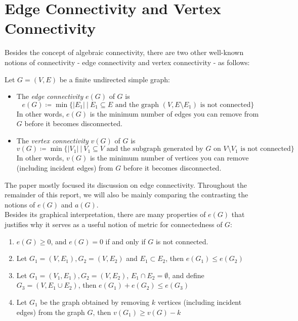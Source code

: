 \documentclass{article}
\begin{document}
\section{Edge Connectivity and Vertex Connectivity}

Besides the concept of algebraic connectivity, there are two other well-known notions of connectivity - edge connectivity and vertex connectivity - as follows:

\begin{definition}
    Let $G = (V, E)$ be a finite undirected simple graph:
    \begin{itemize}
        \item The \textit{edge connectivity} $e(G)$ of $G$ is
    \[e(G) \coloneqq \min \{|E_1|\ |\ E_1 \subseteq E \text{ and the graph $(V, E \setminus E_1)$ is not connected}\}\]
    In other words, $e(G)$ is the minimum number of edges you can remove from $G$ before it becomes disconnected.
    \item The \textit{vertex connectivity} $v(G)$ of $G$ is
    \[v(G) \coloneqq \min \{|V_1|\ |\ V_1 \subseteq V \text{ and the subgraph generated by $G$ on $V\setminus V_1$ is not connected}\}\]
    In other words, $v(G)$ is the minimum number of vertices you can remove (including incident edges) from $G$ before it becomes disconnected.
    \end{itemize}
\end{definition}

The paper mostly focused its discussion on edge connectivity. Throughout the remainder of this report, we will also be mainly comparing the contrasting the notions of $e(G)$ and $a(G)$.\\

Besides its graphical interpretation, there are many properties of $e(G)$ that justifies why it serves as a useful notion of metric for connectedness of $G$:

\begin{theorem}\label{thm::e_facts}
        \begin{enumerate}
        \item $e(G) \geq 0$, and $e(G) = 0$ if and only if $G$ is not connected.
        \item Let $G_1 = (V, E_1), G_2 = (V, E_2)$ and $E_1 \subset E_2$, then $e(G_1) \leq e(G_2)$
        \item Let $G_1 = (V_1, E_1), G_2 = (V, E_2)$, $E_1 \cap E_2 = \emptyset$, and define $G_3 = (V, E_1 \cup E_2)$, then $e(G_1) + e(G_2) \leq e(G_3)$
        \item Let $G_1$ be the graph obtained by removing $k$ vertices (including incident edges) from the graph $G$, then $v(G_1) \geq v(G) - k$
    \end{enumerate}
\end{theorem}
\end{document}
